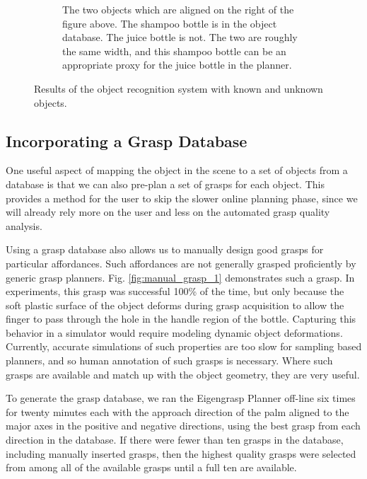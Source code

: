 \begin{figure}
\begin{subfigure}[b]{\columnwidth}
\caption{The two objects which are aligned on the right of the figure above. The shampoo bottle is in the object database. The juice bottle is not. The two are roughly the same width, and this shampoo bottle can be an appropriate proxy for the juice bottle in the planner.}
\label{fig:unknown_objects_1}
\end{subfigure}
\caption{Results of the object recognition system with known and unknown objects.}
\end{figure}


\subsection{Incorporating a Grasp Database}
One useful aspect of mapping the object in the scene to a set of objects from a database is that we can also pre-plan a set of grasps for each object. This provides a method for the user to skip the slower online planning phase, since we will already rely more on the user and less on the automated grasp quality analysis. 

Using a grasp database also allows us to manually design good grasps for particular affordances. Such affordances are not generally grasped proficiently by generic grasp planners. Fig. \ref{fig:manual_grasp_1} demonstrates such a grasp. In experiments, this grasp was successful 100\% of the time, but only because the soft plastic surface of the object deforms during grasp acquisition to allow the finger to pass through the hole in the handle region of the bottle. Capturing this behavior in a simulator would require modeling dynamic object deformations. Currently, accurate simulations of such properties are too slow for sampling based planners, and so human annotation of such grasps is necessary. Where such grasps are available and match up with the object geometry, they are very useful. 

To generate the grasp database, we ran the Eigengrasp Planner off-line six times for twenty minutes each with the approach direction of the palm aligned to the major axes in the positive and negative directions, using the best grasp from each direction in the database. If there were fewer than ten grasps in the database, including manually inserted grasps, then the highest quality grasps were selected from among all of the available grasps until a full ten are available. 

